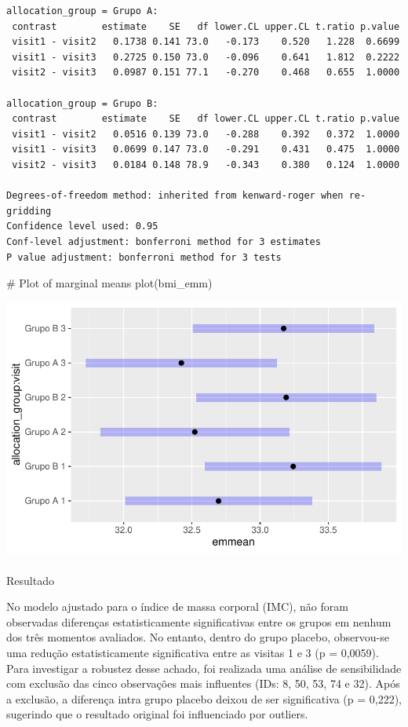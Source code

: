 \documentclass[
  12pt,
]{article}
\makeatletter
\let\oldparagraph\paragraph
\renewcommand{\paragraph}{
    \@ifstar
      \xxxParagraphStar
      \xxxParagraphNoStar
  }
\newcommand{\xxxParagraphStar}[1]{\oldparagraph*{#1}\mbox{}}
\newcommand{\xxxParagraphNoStar}[1]{\oldparagraph{#1}\mbox{}}
\newenvironment{Shaded}{\begin{snugshade}}{\end{snugshade}}
\newcommand{\CommentTok}[1]{\textcolor[rgb]{0.37,0.37,0.37}{#1}}
\newcommand{\FunctionTok}[1]{\textcolor[rgb]{0.28,0.35,0.67}{#1}}
\newcommand{\NormalTok}[1]{\textcolor[rgb]{0.00,0.23,0.31}{#1}}
\makeatother
\begin{document}
\begin{verbatim}
allocation_group = Grupo A:
 contrast        estimate    SE   df lower.CL upper.CL t.ratio p.value
 visit1 - visit2   0.1738 0.141 73.0   -0.173    0.520   1.228  0.6699
 visit1 - visit3   0.2725 0.150 73.0   -0.096    0.641   1.812  0.2222
 visit2 - visit3   0.0987 0.151 77.1   -0.270    0.468   0.655  1.0000

allocation_group = Grupo B:
 contrast        estimate    SE   df lower.CL upper.CL t.ratio p.value
 visit1 - visit2   0.0516 0.139 73.0   -0.288    0.392   0.372  1.0000
 visit1 - visit3   0.0699 0.147 73.0   -0.291    0.431   0.475  1.0000
 visit2 - visit3   0.0184 0.148 78.9   -0.343    0.380   0.124  1.0000

Degrees-of-freedom method: inherited from kenward-roger when re-gridding 
Confidence level used: 0.95 
Conf-level adjustment: bonferroni method for 3 estimates 
P value adjustment: bonferroni method for 3 tests 
\end{verbatim}

\begin{Shaded}
\begin{Highlighting}[]
\CommentTok{\# Plot of marginal means}
\FunctionTok{plot}\NormalTok{(bmi\_emm)}
\end{Highlighting}
\end{Shaded}

\includegraphics{Outcomes_files/figure-pdf/bmi_sens_emm-1.pdf}

\paragraph{Resultado}\label{resultado-14}

No modelo ajustado para o índice de massa corporal (IMC), não foram
observadas diferenças estatisticamente significativas entre os grupos em
nenhum dos três momentos avaliados. No entanto, dentro do grupo placebo,
observou-se uma redução estatisticamente significativa entre as visitas
1 e 3 (p = 0,0059). Para investigar a robustez desse achado, foi
realizada uma análise de sensibilidade com exclusão das cinco
observações mais influentes (IDs: 8, 50, 53, 74 e 32). Após a exclusão,
a diferença intra grupo placebo deixou de ser significativa (p = 0,222),
sugerindo que o resultado original foi influenciado por outliers.
\end{document}
